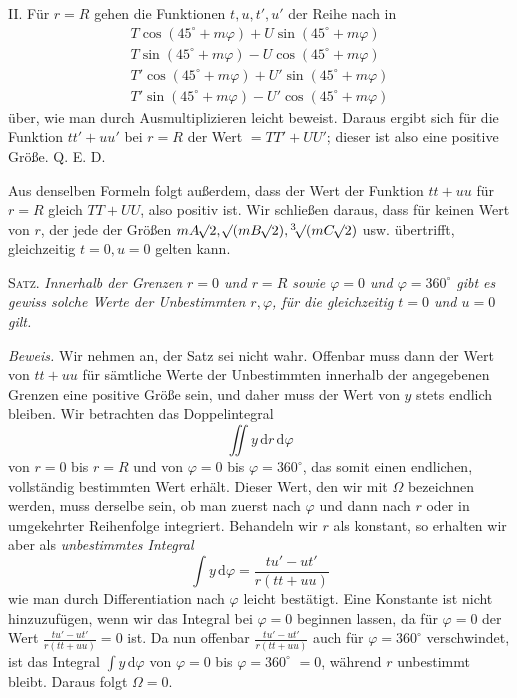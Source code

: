II. Für $r=R$ gehen die Funktionen $t,u,t',u'$ der Reihe nach in
\[
\begin{gathered}
T\cos(45^\circ+m\varphi)+U\sin(45^\circ+m\varphi)\\
T\sin(45^\circ+m\varphi)-U\cos(45^\circ+m\varphi)\\
T'\cos(45^\circ+m\varphi)+U'\sin(45^\circ+m\varphi)\\
T'\sin(45^\circ+m\varphi)-U'\cos(45^\circ+m\varphi)
\end{gathered}
\]
über, wie man durch Ausmultiplizieren leicht beweist. Daraus ergibt sich für die Funktion $tt'+uu'$ bei $r=R$ der Wert $=TT'+UU'$; dieser ist also eine positive Größe. Q. E. D.

Aus denselben Formeln folgt außerdem, dass der Wert der Funktion $tt+uu$ für $r=R$ gleich $TT+UU$, also positiv ist. Wir schließen daraus, dass für keinen Wert von $r$, der jede der Größen $mA\BareRoot{2},\BareRoot{(mB\BareRoot{2})},\BareRoot[3]{(mC\BareRoot{2})}$ usw. übertrifft, gleichzeitig $t=0,u=0$ gelten kann.

\textsc{Satz.} \textit{Innerhalb der Grenzen $r=0$ und $r=R$ sowie $\varphi=0$ und $\varphi=360^\circ$ gibt es gewiss solche Werte der Unbestimmten $r,\varphi$, für die gleichzeitig $t=0$ und $u=0$ gilt.}

\textit{Beweis.} Wir nehmen an, der Satz sei nicht wahr. Offenbar muss dann der Wert von $tt+uu$ für sämtliche Werte der Unbestimmten innerhalb der angegebenen Grenzen eine positive Größe sein, und daher muss der Wert von $y$ stets endlich bleiben. Wir betrachten das Doppelintegral
\[
\iint y\,\mathrm dr\,\mathrm d\varphi
\]
von $r=0$ bis $r=R$ und von $\varphi=0$ bis $\varphi=360^\circ$, das somit einen endlichen, vollständig bestimmten Wert erhält. Dieser Wert, den
wir mit $\Omega$ bezeichnen werden, muss derselbe sein, ob man zuerst nach $\varphi$ und dann nach $r$ oder in umgekehrter Reihenfolge integriert. Behandeln wir $r$ als konstant, so erhalten wir aber als \textit{unbestimmtes Integral}
\[
\int y\,\mathrm d\varphi=\frac{tu'-ut'}{r(tt+uu)}
\]
wie man durch Differentiation nach $\varphi$ leicht bestätigt. Eine Konstante ist nicht hinzuzufügen, wenn wir das Integral bei $\varphi=0$ beginnen lassen, da für $\varphi=0$ der Wert $\frac{tu'-ut'}{r(tt+uu)}=0$ ist. Da nun offenbar $\frac{tu'-ut'}{r(tt+uu)}$ auch für $\varphi=360^\circ$ verschwindet, ist das Integral $\int y\,\mathrm d\varphi$ von $\varphi=0$ bis $\varphi=360^\circ$ $=0$, während $r$ unbestimmt bleibt. Daraus folgt $\Omega=0$.

